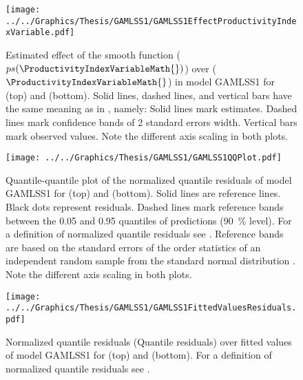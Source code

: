 \begin{figure}[h]
  \centering
  \texttt{[image: ../../Graphics/Thesis/GAMLSS1/GAMLSS1EffectProductivityIndexVariable.pdf]}
  \caption{Estimated effect of the \ProductivityIndexVariableText{} smooth function (\(ps(\ProductivityIndexVariableMath{})\)) over \ProductivityIndexVariableText{} (\(\ProductivityIndexVariableMath{}\)) in model GAMLSS1 for \Beech{} (top) and \Spruce{} (bottom).  Solid lines, dashed lines, and vertical bars have the same meaning as in , namely:  Solid lines mark estimates.  Dashed lines mark confidence bands of 2 standard errors width.  Vertical bars mark observed values.  Note the different axis scaling in both plots.}
  \label{fig:GAMLSS1EffectProductivityIndexVariable}
\end{figure}

\begin{figure}[h]
  \centering
  \texttt{[image: ../../Graphics/Thesis/GAMLSS1/GAMLSS1QQPlot.pdf]}
  \caption{Quantile-quantile plot of the normalized quantile residuals of model GAMLSS1 for \Beech{} (top) and \Spruce{} (bottom).  Solid lines are reference lines.  Black dots represent residuals.  Dashed lines mark reference bands between the \num{0.05} and \num{0.95} quantiles of predictions (\SI{90}{\percent} level).  For a definition of normalized quantile residuals see \textcite{Dunn1996}.  Reference bands are based on the standard errors of the order statistics of an independent random sample from the standard normal distribution \parencite{Fox2016}.  Note the different axis scaling in both plots.}
  \label{fig:GAMLSS1QQPlot}
\end{figure}

\begin{figure}[h]
  \centering
  \texttt{[image: ../../Graphics/Thesis/GAMLSS1/GAMLSS1FittedValuesResiduals.pdf]}
  \caption{Normalized quantile residuals (Quantile residuals) over fitted values of model GAMLSS1 for \Beech{} (top) and \Spruce{} (bottom).  For a definition of normalized quantile residuals see \textcite{Dunn1996}.}
  \label{fig:GAMLSS1FittedValuesResiduals}
\end{figure}

